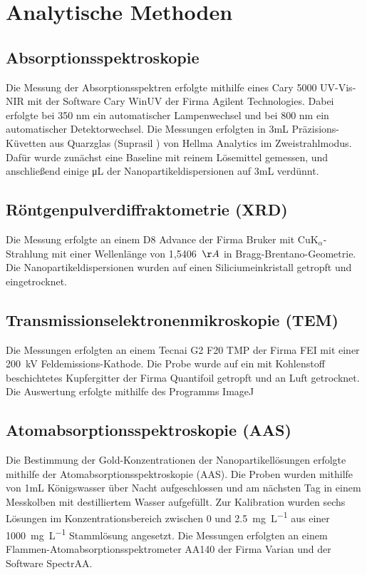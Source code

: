 \section{Analytische Methoden}

\subsection{Absorptionsspektroskopie}
	Die Messung der Absorptionsspektren erfolgte mithilfe eines Cary 5000 UV-Vis-NIR mit
	der Software Cary WinUV der Firma Agilent Technologies. 
	Dabei erfolgte bei 350 nm ein automatischer Lampenwechsel und bei 800 nm ein automatischer Detektorwechsel.
	Die	Messungen erfolgten in 3mL Präzisions-Küvetten aus Quarzglas (Suprasil \textregistered) von Hellma	Analytics im Zweistrahlmodus. 
	Dafür wurde zunächst eine Baseline mit reinem Lösemittel gemessen, und anschließend einige \si{\micro\liter} der Nanopartikeldispersionen auf 3mL verdünnt.

\subsection{Röntgenpulverdiffraktometrie (XRD)}
	Die Messung erfolgte an einem D8 Advance der Firma Bruker mit CuK$_{\alpha}$-Strahlung mit einer Wellenlänge von 1,5406~$\AA$ in Bragg-Brentano-Geometrie.
	Die Nanopartikeldispersionen wurden auf einen Siliciumeinkristall getropft und eingetrocknet.
	
\subsection{Transmissionselektronenmikroskopie (TEM)}
	Die Messungen erfolgten an einem Tecnai G2 F20 TMP der Firma FEI mit einer 200~kV
	Feldemissions-Kathode. 
	Die Probe wurde auf ein mit Kohlenstoff beschichtetes Kupfergitter der Firma
	Quantifoil getropft und an Luft getrocknet.
	Die Auswertung erfolgte mithilfe des Programms ImageJ


\subsection{Atomabsorptionsspektroskopie (AAS)}
	Die Bestimmung der Gold-Konzentrationen der Nanopartikellösungen erfolgte mithilfe
	der Atomabsorptionsspektroskopie (AAS). 
	Die Proben wurden mithilfe von 1mL Königswasser über Nacht aufgeschlossen und am
	nächsten Tag in einem Messkolben mit destilliertem Wasser aufgefüllt. Zur Kalibration wurden sechs Lösungen im Konzentrationsbereich zwischen 0 und \SI{2,5}{\milli\gram\liter\tothe{-1}} aus einer
	\SI{1000}{\milli\gram\liter\tothe{-1}} Stammlösung angesetzt.
	Die Messungen erfolgten an einem Flammen-Atomabsorptionsspektrometer AA140 der
	Firma Varian und der Software SpectrAA.